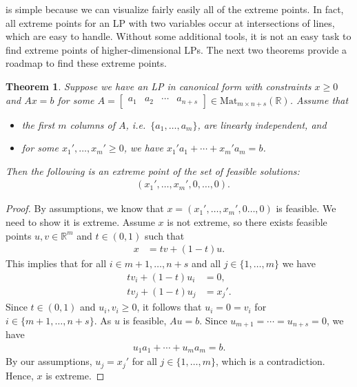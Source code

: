 \documentclass[a4paper, 12pt]{article}
\numberwithin{equation}{section}
\numberwithin{figure}{section}
\newtheorem{thm}{Theorem}[section]
\theoremstyle{definition}
\renewcommand{\geq}{\geqslant}
\newcommand{\R}{\mathbb{R}}
\begin{document}
 is simple because we can visualize fairly easily all
of the extreme points. In fact, all extreme points for an LP with two variables
occur at intersections of lines, which are easy to handle. Without some
additional tools, it is not an easy task to find extreme points of
higher-dimensional LPs. The next two theorems provide a roadmap to find these
extreme points. 


\begin{thm}\label{thm:extreme-I}
	Suppose we have an LP in canonical form with constraints $x\geq 0$ and
	$Ax=b$ for some $A=\begin{bmatrix} a_1 & a_2 & \cdots & a_{n+s}
	\end{bmatrix}\in\mathrm{Mat}_{m\times n+s}(\R)$. Assume that 
	\begin{itemize}
		\item the first $m$ columns of $A$, i.e.\ $\{a_1, \dots, a_m\}$, are linearly independent, and
		\item for some $x_1', \dots, x_m'\geq 0$, we have $x_1'a_1 + \cdots + x_m'a_m = b$.
	\end{itemize}
	Then the following is an extreme point of the set of feasible solutions: 
	\begin{align*}
		& (x_1', \dots, x_m', 0, \dots, 0).
	\end{align*}
\end{thm}

\begin{proof}
	By assumptions, we know that $x = (x_1', \dots, x_m', 0\dots, 0)$ is
	feasible. We need to show it is extreme. Assume $x$ is not extreme, so there
	exists feasible points $u,v\in\mathbb{R}^m$ and $t\in (0, 1)$ such that 
	\begin{align*}
		x &= tv + (1-t)u.
	\end{align*}
	This implies that for all $i\in {m+1,\dots, n+s}$ and all $j\in \{1,\dots, m\}$ we have 
	\begin{align*}
		tv_i + (1-t)u_i &= 0, \\
		tv_j + (1-t)u_j &= x_j'.
	\end{align*}
	Since $t\in (0,1)$
	and $u_i,v_i\geq 0$, it follows that $u_i=0=v_i$ for $i\in \{m+1,\dots,
	n+s\}$. As $u$ is feasible, $Au=b$. Since $u_{m+1}=\cdots =u_{n+s}=0$, we have 
	\begin{align*}
		u_1a_1 + \cdots + u_ma_m = b.
	\end{align*}
	By our assumptions, $u_j = x_j'$ for all $j\in \{1,\dots, m\}$, which is a contradiction. Hence, $x$ is extreme.
\end{proof}
\end{document}

